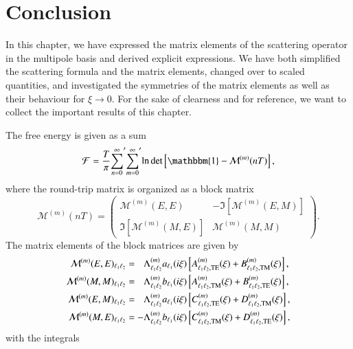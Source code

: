 \section{Conclusion}

In this chapter, we have expressed the matrix elements of the scattering
operator in the multipole basis and derived explicit expressions. We have both
simplified the scattering formula and the matrix elements, changed over to
scaled quantities, and investigated the symmetries of the matrix elements as well as their behaviour
for $\xi\to0$. For the sake of clearness and for reference,
we want to collect the important results of this chapter.

The free energy is given as a sum
\begin{equation}
\mathcal{F} = \frac{T}{\pi} {\sum_{n=0}^\infty}^\prime {\sum_{m=0}^\infty}^\prime \log\det \left[ \mathbbm{1} - \mathcal{M}^{(m)}(nT)\right],
\end{equation}
where the round-trip matrix is organized as a block matrix
\begin{equation}
\mathcal{M}^{(m)}(nT) = \left(\begin{array}{cc}
\mathcal{M}^{(m)}(E,E)                 & -\Im\left[\mathcal{M}^{(m)}(E,M)\right] \\
\Im\left[\mathcal{M}^{(m)}(M,E)\right] & \mathcal{M}^{(m)}(M,M)
\end{array}
\right).
\end{equation}
The matrix elements of the block matrices are given by
\begin{align}
\mathcal{M}^{(m)}(E,E)_{\ell_1 \ell_2} &= \phantom{-}\Lambda^{(m)}_{\ell_1 \ell_2} a_{\ell_1}(i\xi) \left[ A^{(m)}_{\ell_1 \ell_2,\mathrm{TE}}(\xi)+ B^{(m)}_{\ell_1 \ell_2, \mathrm{TM}}(\xi)\right], \\
\mathcal{M}^{(m)}(M,M)_{\ell_1 \ell_2} &= \phantom{-}\Lambda^{(m)}_{\ell_1 \ell_2} b_{\ell_1}(i\xi) \left[ A^{(m)}_{\ell_1 \ell_2,\mathrm{TM}}(\xi)+ B^{(m)}_{\ell_1 \ell_2, \mathrm{TE}}(\xi)\right], \\
\mathcal{M}^{(m)}(E,M)_{\ell_1 \ell_2} &= \phantom{-}\Lambda^{(m)}_{\ell_1 \ell_2} a_{\ell_1}(i\xi) \left[ C^{(m)}_{\ell_1 \ell_2,\mathrm{TE}}(\xi)+ D^{(m)}_{\ell_1 \ell_2, \mathrm{TM}}(\xi)\right], \\
\mathcal{M}^{(m)}(M,E)_{\ell_1 \ell_2} &= -\Lambda^{(m)}_{\ell_1 \ell_2} b_{\ell_1}(i\xi) \left[ C^{(m)}_{\ell_1 \ell_2,\mathrm{TM}}(\xi)+ D^{(m)}_{\ell_1 \ell_2, \mathrm{TE}}(\xi)\right],
\end{align}
with the integrals
